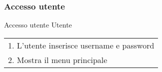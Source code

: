 \begin{minipage}{\textwidth}
    \subsubsection{Accesso utente}
    \usecase
        {Accesso utente}
        {Utente}
        {
            \begin{tabular}{l}
                1. L'utente inserisce username e password\\
                2. Mostra il menu principale
            \end{tabular} \\
        }
        \vspace{0.5cm}

\end{minipage}
